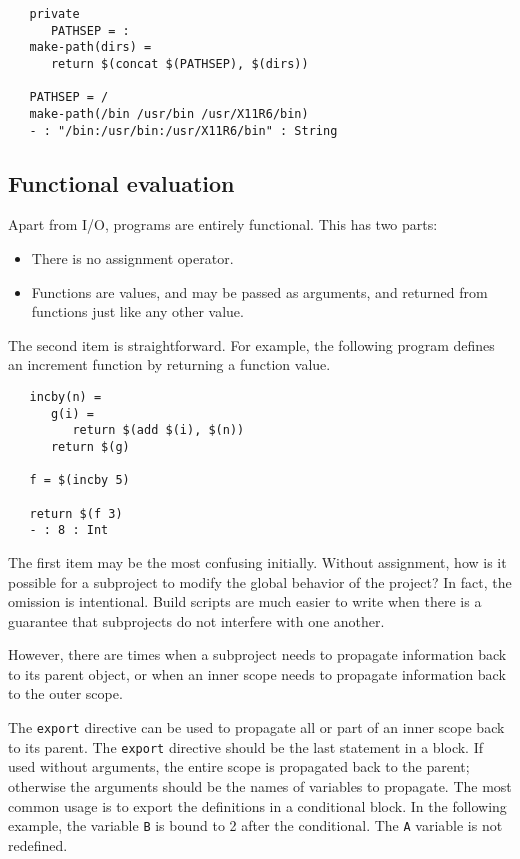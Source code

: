 \begin{verbatim}
   private
      PATHSEP = :
   make-path(dirs) =
      return $(concat $(PATHSEP), $(dirs))

   PATHSEP = /
   make-path(/bin /usr/bin /usr/X11R6/bin)
   - : "/bin:/usr/bin:/usr/X11R6/bin" : String
\end{verbatim}

\subsection{Functional evaluation}

Apart from I/O,  programs are entirely functional.  This has two parts:

\begin{itemize}
\item There is no assignment operator.
\item Functions are values, and may be passed as arguments, and returned from
      functions just like any other value.
\end{itemize}

The second item is straightforward.  For example, the following program defines
an increment function by returning a function value.

\begin{verbatim}
   incby(n) =
      g(i) =
         return $(add $(i), $(n))
      return $(g)

   f = $(incby 5)

   return $(f 3)
   - : 8 : Int
\end{verbatim}

The first item may be the most confusing initially.  Without assignment, how is
it possible for a subproject to modify the global behavior of the project?  In fact,
the omission is intentional.  Build scripts are much easier to write when there
is a guarantee that subprojects do not interfere with one another.

However, there are times when a subproject needs to propagate
information back to its parent object, or when an inner scope needs to
propagate information back to the outer scope.

The \verb+export+ directive can be used to propagate all or part of an
inner scope back to its parent.  The \verb+export+ directive should be
the last statement in a block.  If used without arguments, the entire
scope is propagated back to the parent; otherwise the arguments should
be the names of variables to propagate.  The most common usage is
to export the definitions in a conditional block.  In the following
example, the variable \verb+B+ is bound to 2 after the conditional.
The \verb+A+ variable is not redefined.

